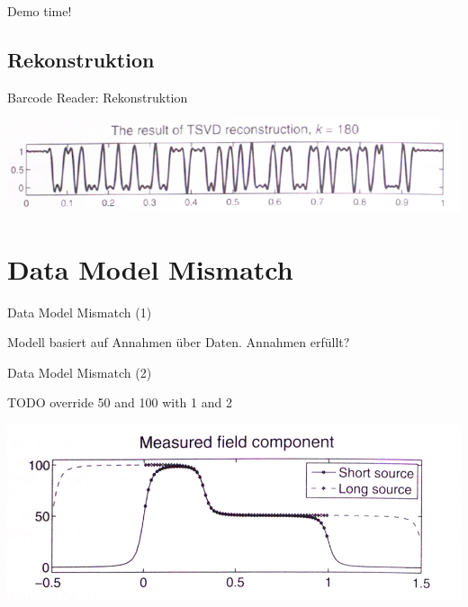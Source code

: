 \documentclass[11pt]{beamer}
\begin{document}
\begin{frame}
\begin{center}
Demo time!
\end{center}
\end{frame}


\subsection{Rekonstruktion}
\begin{frame}{Barcode Reader: Rekonstruktion}
\begin{center}
\includegraphics[scale=0.5]{Barcode_TSVD.PNG} 
\end{center}
\end{frame}


\section{Data Model Mismatch}
\begin{frame}{Data Model Mismatch (1)}

Modell basiert auf Annahmen über Daten. Annahmen erfüllt?

\end{frame}



\begin{frame}{Data Model Mismatch (2)}

\begin{center}

TODO override 50 and 100 with 1 and 2

\includegraphics[scale=0.5]{DataModel_graph.PNG} 

\end{center}

\end{frame}
\end{document}
